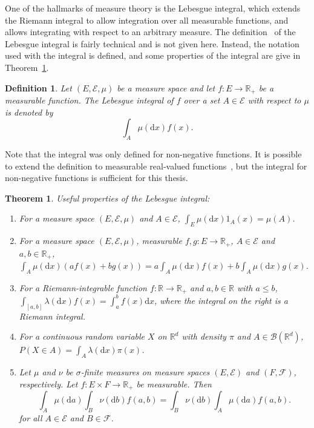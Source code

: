 \documentclass[english,twoside,openright]{HYgraduMLDS}
\newtheorem{theorem}{Theorem}
\newtheorem{definition}{Definition}
\newcommand{\R}{\mathbb{R}}
\newcommand{\dx}{\mathrm{d}}
\begin{document}
One of the hallmarks of measure theory is the Lebesgue integral, which
extends the Riemann integral to allow integration over all measurable functions,
and allows integrating with respect to an arbitrary measure. The
definition~\cite[Definition 4.3]{Cin11}
of the Lebesgue integral is fairly technical and is not given here. Instead,
the notation used with the integral is defined, and some properties of the
integral are give in Theorem~\ref{lebesgue_integral_theorem}.

\begin{definition}
	Let \((E, \mathcal{E}, \mu)\) be a measure space and let \(f\colon E\to \R_{+}\)
  be a measurable function. The Lebesgue integral of \(f\) over a set
  \(A\in \mathcal{E}\) with respect to \(\mu\) is denoted by
  \[
    \int_{A}\mu(\dx x)f(x).
  \]
\end{definition}
Note that the integral was only defined for non-negative functions. It is possible
to extend the definition to measurable real-valued functions~\cite{Cin11},
but the integral for non-negative functions is sufficient for this thesis.

\begin{theorem}\label{lebesgue_integral_theorem}
  Useful properties of the Lebesgue integral\cite{Cin11}:
	\begin{enumerate}
    \item For a measure space \((E, \mathcal{E}, \mu)\) and
          \(A\in \mathcal{E}\), \(\int_{E}\mu(\dx x)1_{A}(x) = \mu(A)\).
    \item For a measure space \((E, \mathcal{E}, \mu)\), measurable
          \(f, g\colon E\to \R_{+}\), \(A\in \mathcal{E}\) and \(a, b\in \R_{+}\),
          \(\int_{A} \mu(\dx x)(af(x) + bg(x))
          = a\int_{A} \mu(\dx x) f(x) + b\int_{A} \mu(\dx x) g(x)\).
    \item For a Riemann-integrable function \(f\colon \R\to \R_{+}\) and
          \(a, b\in \R\) with \(a \leq b\),
          \(\int_{[a, b]}\lambda(\dx x)f(x) = \int_{a}^{b}f(x)\dx x\),
          where the integral on the right is a Riemann integral.
    \item For a continuous random variable \(X\) on \(\R^{d}\) with
          density \(\pi\) and \(A\in \mathcal{B}(\R^{d})\),
          \(P(X\in A) = \int_{A}\lambda(\dx x)\pi(x)\).
    \item Let \(\mu\) and \(\nu\) be \(\sigma\)-finite measures on
          measure spaces \((E, \mathcal{E})\) and \((F, \mathcal{F})\),
          respectively. Let \(f\colon E\times F\to \R_{+}\) be measurable.
          Then
          \[
          \int_{A}\mu(\dx a)\int_{B}\nu(\dx b)f(a, b)
          = \int_{B}\nu(\dx b)\int_{A}\mu(\dx a)f(a, b).
          \]
          for all \(A\in \mathcal{E}\) and \(B\in \mathcal{F}\).
  \end{enumerate}
\end{theorem}
\end{document}
